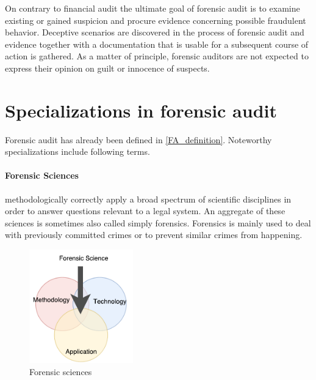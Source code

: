 On contrary to financial audit the ultimate goal of forensic audit is to examine existing or gained suspicion and procure evidence concerning possible fraudulent behavior. Deceptive scenarios are discovered in the process of forensic audit and evidence together with a documentation that is usable for a subsequent course of action is gathered. As a matter of principle, forensic auditors are not expected to express their opinion on guilt or innocence of suspects.


\section{Specializations in forensic audit}
Forensic audit has already been defined in \ref{FA_definition}. Noteworthy specializations include following terms.%


\paragraph{Forensic Sciences} methodologically correctly apply a broad spectrum of scientific disciplines in order to answer questions relevant to a legal system. \cite{kyfranke} An aggregate of these sciences is sometimes also called simply forensics. Forensics is mainly used to deal with previously committed crimes or to prevent similar crimes from happening.


\begin{figure}[h]
	\begin{center} 
	\includegraphics[width=0.4\textwidth]{img/forensic_science.pdf}
	\end{center}
	\caption{Forensic sciences}
\end{figure}

